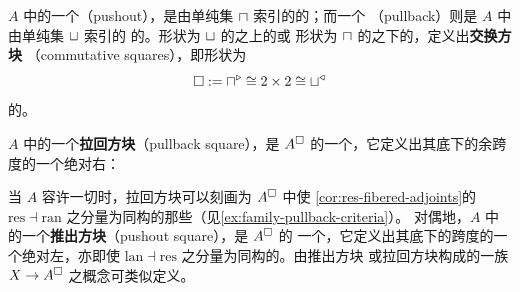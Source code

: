 \begin{definition}\label{def:pushout-pullback}
\trInfinityCategory{} $A$ 中的一个\textbf{\trPushout}（pushout），是由单纯集
$\sqcap$ 索引的\trDiagram{}的\trColimit{}；而一个\textbf{\trPullback}
（pullback）则是\trInfinityCategory{} $A$ 中由单纯集 $\sqcup$ 索引的%
\trDiagram{}的\trLimit{}。形状为 $\sqcup$ 的\trDiagram{}之上的\trCone{}或
形状为 $\sqcap$ 的\trDiagram{}之下的\trCone{}，定义出\textbf{交换方块}
（commutative squares），即形状为
\begin{equation*}
\square:=\sqcap^{\triangleright}\cong 2\times 2\cong\sqcup^{\triangleleft}
\end{equation*}
的\trDiagram{}。

\trInfinityCategory{} $A$ 中的一个\textbf{拉回方块}（pullback square），是
$A^{\square}$ 的一个\trElement{}，它定义出其底下的余跨度的一个绝对右\trLifting{}：
\begin{center}
\qquad
{}
\end{center}
当 $A$ 容许一切\trPullback{}时，拉回方块可以刻画为 $A^{\square}$ 中使%
\cref{cor:res-fibered-adjoints}的\trAdjunction{} $\mathrm{res}\dashv\mathrm{ran}$
之\trUnit{}分量为同构的那些\trElement{}（见\cref{ex:family-pullback-criteria}）。
对偶地，$A$ 中的一个\textbf{推出方块}（pushout square），是 $A^{\square}$ 的
一个\trElement{}，它定义出其底下的跨度的一个绝对左\trLifting{}，亦即使\trAdjunction
$\mathrm{lan}\dashv\mathrm{res}$ 之\trCounit{}分量为同构的\trElement{}。由推出方块
或拉回方块构成的一族 $X\to A^{\square}$ 之概念可类似定义。
\end{definition}

